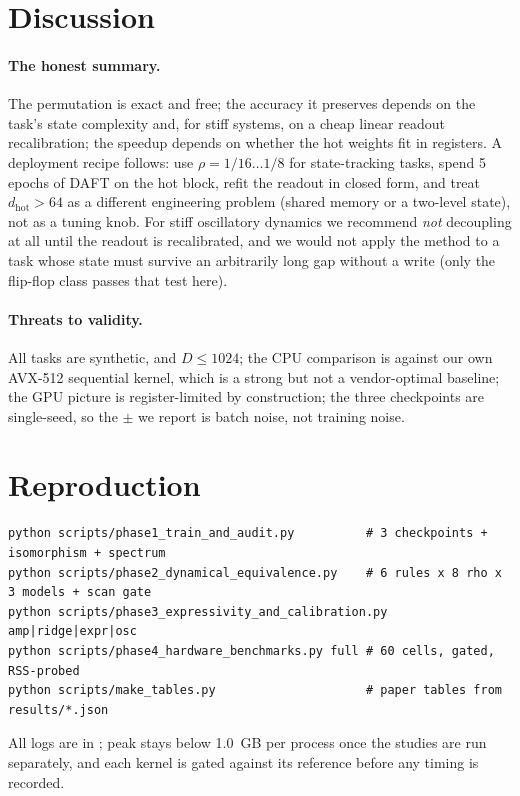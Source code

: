 \documentclass[11pt]{article}
\theoremstyle{definition}
\newcommand{\code}[1]{\texttt{\detokenize{#1}}}
\begin{document}
\section{Discussion}

\paragraph{The honest summary.} The permutation is exact and free; the accuracy it preserves depends on the
task's state complexity and, for stiff systems, on a cheap linear readout recalibration; the speedup depends
on whether the hot weights fit in registers. A deployment recipe follows: use $\rho=1/16\dots1/8$ for
state-tracking tasks, spend 5 epochs of DAFT on the hot block, refit the readout in closed form, and treat
$d_{\text{hot}}>64$ as a different engineering problem (shared memory or a two-level state), not as a tuning
knob. For stiff oscillatory dynamics we recommend \emph{not} decoupling at all until the readout is
recalibrated, and we would not apply the method to a task whose state must survive an arbitrarily long gap
without a write (only the flip-flop class passes that test here).

\paragraph{Threats to validity.} All tasks are synthetic, and $D\le1024$; the CPU comparison is against our own
AVX-512 sequential kernel, which is a strong but not a vendor-optimal baseline; the GPU picture is
register-limited by construction; the three checkpoints are single-seed, so the $\pm$ we report is batch noise,
not training noise.

\section{Reproduction}

\begin{verbatim}
python scripts/phase1_train_and_audit.py          # 3 checkpoints + isomorphism + spectrum
python scripts/phase2_dynamical_equivalence.py    # 6 rules x 8 rho x 3 models + scan gate
python scripts/phase3_expressivity_and_calibration.py amp|ridge|expr|osc
python scripts/phase4_hardware_benchmarks.py full # 60 cells, gated, RSS-probed
python scripts/make_tables.py                     # paper tables from results/*.json
\end{verbatim}

All logs are in \code{results/}; peak \code{RssAnon} stays below 1.0~GB per process once the studies are run
separately, and each kernel is gated against its reference before any timing is recorded.
\end{document}
